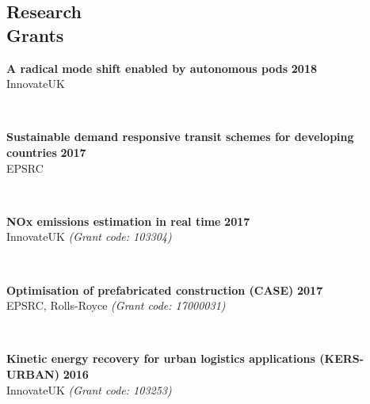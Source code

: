 \documentclass[margin]{res}
\newcommand\tab[1][1cm]{\hspace*{#1}}
\begin{document}
\begin{resume}
\vspace{-0.20in}
\section{\sc Research\\ Grants}
	\vspace{0.03in}
	\begin{minipage}{\textwidth}
	{\bf A radical mode shift enabled by autonomous pods} \hfill {\bf 2018} \\
	\tab[0.2in] 
	\quad InnovateUK
	\end{minipage}
	\\
	\vspace{0.03in}
	\begin{minipage}{\textwidth}
	{\bf Sustainable demand responsive transit schemes for developing countries} \hfill {\bf 2017} \\
	\tab[0.2in] 
	\quad EPSRC
	\end{minipage}
	\\
	\vspace{0.03in}
	\begin{minipage}{\textwidth}
	{\bf NOx emissions estimation in real time} \hfill {\bf 2017} \\
	\tab[0.2in] 
	\quad InnovateUK
	\textit{(Grant code: 103304)}
	\end{minipage}
	\\
	\vspace{0.03in}
	\begin{minipage}{\textwidth}
	{\bf Optimisation of prefabricated construction (CASE)} \hfill {\bf 2017} \\
	\tab[0.2in] 
	\quad EPSRC, Rolls-Royce
	\textit{(Grant code: 17000031)}
	\end{minipage}
	\\
	\vspace{0.03in}
	\begin{minipage}{\textwidth}
	{\bf Kinetic energy recovery for urban logistics applications (KERS-URBAN)} \hfill {\bf 2016} \\
	\tab[0.2in] 
	\quad InnovateUK
	\textit{(Grant code: 103253)}
	\end{minipage}
	\\
	\vspace{0.03in}
	\begin{minipage}{\textwidth}

\end{minipage}
\end{resume}
\end{document}

